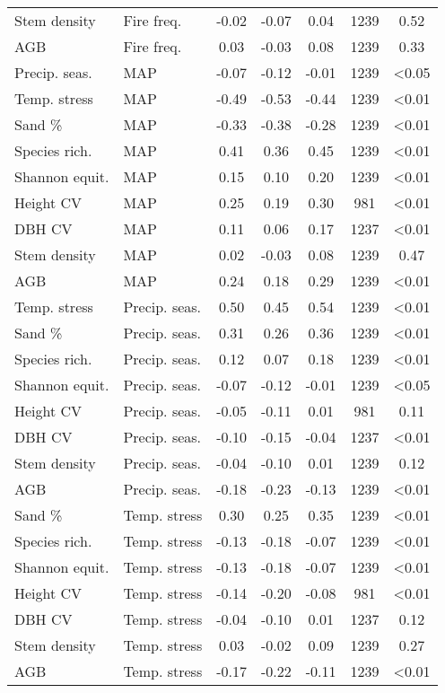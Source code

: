 \begin{longtable}[H]{llS[table-format=-1.2]S[table-format=-1.2]S[table-format=-1.2]S[table-format=4.0]S[table-format=<1.2]}
Stem density & Fire freq. & -0.02 & -0.07 & 0.04 & 1239 & 0.52 \\ 
AGB & Fire freq. & 0.03 & -0.03 & 0.08 & 1239 & 0.33 \\ 
Precip. seas. & MAP & -0.07 & -0.12 & -0.01 & 1239 & <0.05 \\ 
Temp. stress & MAP & -0.49 & -0.53 & -0.44 & 1239 & <0.01 \\ 
Sand \% & MAP & -0.33 & -0.38 & -0.28 & 1239 & <0.01 \\ 
Species rich. & MAP & 0.41 & 0.36 & 0.45 & 1239 & <0.01 \\ 
Shannon equit. & MAP & 0.15 & 0.10 & 0.20 & 1239 & <0.01 \\ 
Height CV & MAP & 0.25 & 0.19 & 0.30 & 981 & <0.01 \\ 
DBH CV & MAP & 0.11 & 0.06 & 0.17 & 1237 & <0.01 \\ 
Stem density & MAP & 0.02 & -0.03 & 0.08 & 1239 & 0.47 \\ 
AGB & MAP & 0.24 & 0.18 & 0.29 & 1239 & <0.01 \\ 
Temp. stress & Precip. seas. & 0.50 & 0.45 & 0.54 & 1239 & <0.01 \\ 
Sand \% & Precip. seas. & 0.31 & 0.26 & 0.36 & 1239 & <0.01 \\ 
Species rich. & Precip. seas. & 0.12 & 0.07 & 0.18 & 1239 & <0.01 \\ 
Shannon equit. & Precip. seas. & -0.07 & -0.12 & -0.01 & 1239 & <0.05 \\ 
Height CV & Precip. seas. & -0.05 & -0.11 & 0.01 & 981 & 0.11 \\ 
DBH CV & Precip. seas. & -0.10 & -0.15 & -0.04 & 1237 & <0.01 \\ 
Stem density & Precip. seas. & -0.04 & -0.10 & 0.01 & 1239 & 0.12 \\ 
AGB & Precip. seas. & -0.18 & -0.23 & -0.13 & 1239 & <0.01 \\ 
Sand \% & Temp. stress & 0.30 & 0.25 & 0.35 & 1239 & <0.01 \\ 
Species rich. & Temp. stress & -0.13 & -0.18 & -0.07 & 1239 & <0.01 \\ 
Shannon equit. & Temp. stress & -0.13 & -0.18 & -0.07 & 1239 & <0.01 \\ 
Height CV & Temp. stress & -0.14 & -0.20 & -0.08 & 981 & <0.01 \\ 
DBH CV & Temp. stress & -0.04 & -0.10 & 0.01 & 1237 & 0.12 \\ 
Stem density & Temp. stress & 0.03 & -0.02 & 0.09 & 1239 & 0.27 \\ 
AGB & Temp. stress & -0.17 & -0.22 & -0.11 & 1239 & <0.01 \\ 

\end{longtable}

